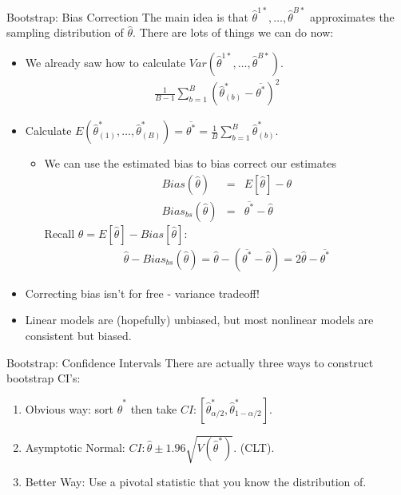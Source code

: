 \begin{frame}{Bootstrap: Bias Correction}
  \small
  The main idea is that $\hat{\theta}^{1*},\ldots, \hat{\theta}^{B*}$ approximates the \alert{sampling distribution} of $\hat{\theta}$. There are lots of things we can do now:
  \begin{itemize}
  \item We already saw how to calculate $Var(\hat{\theta}^{1*},\ldots, \hat{\theta}^{B*})$.
  \begin{eqnarray*}
  \frac{1}{B-1} \sum_{b=1}^B (\hat{\theta}_{(b)}^* - \overline{\theta^{*}})^2
  \end{eqnarray*}
  
  \item Calculate $E(\hat{\theta}^{*}_{(1)},\ldots, \hat{\theta}^{*}_{(B)}) = \overline{\theta^{*}} = \frac{1}{B} \sum_{b=1}^B \hat{\theta}_{(b)}^*$.
  \begin{itemize}
  \item We can use the estimated bias to \alert{bias correct} our estimates
  \begin{eqnarray*}
  Bias(\hat{\theta}) &=&E[\hat{\theta}] - \theta \\
  Bias_{bs}(\hat{\theta}) &=&\overline{\theta^{*}} -\hat{\theta}
  \end{eqnarray*}
  Recall $\theta = E[\hat{\theta}] - Bias[\hat{\theta}]$:
  \begin{eqnarray*}
  \hat{\theta}- Bias_{bs}(\hat{\theta}) = \hat{\theta}-(\overline{\theta^{*}}-\hat{\theta}) = 2 \hat{\theta} - \overline{\theta^{*}}
  \end{eqnarray*}
  \end{itemize}
  \item Correcting bias isn't for free - variance tradeoff!
  \item Linear models are (hopefully) unbiased, but most nonlinear models are \alert{consistent but biased}.
  \end{itemize}
  \end{frame}
  
  
\begin{frame}{Bootstrap: Confidence Intervals}
  There are actually three ways to construct bootstrap CI's:
  \begin{enumerate}
  \item Obvious way: sort  $\hat{\theta}^{*}$ then take $CI: [\hat{\theta}^{*}_{\alpha/2},\hat{\theta}^{*}_{1-\alpha/2}]$.
  \item Asymptotic Normal:  $CI: \hat{\theta} \pm 1.96 \sqrt{V(\hat{\theta}^{*})}$. (CLT).
  \item Better Way: Use a pivotal statistic that you know the distribution of.
  \end{enumerate}
\end{frame}

